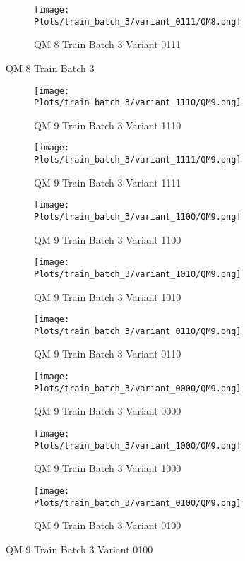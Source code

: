 \documentclass{DissertateFigs}
\begin{document}
\begin{figure}[t!]
\medskip

    \begin{subfigure}{0.38\textwidth}
    \texttt{[image: Plots/train\_batch\_3/variant\_0111/QM8.png]}
    \caption{QM 8 Train Batch 3 Variant 0111}
    \end{subfigure}
\caption{QM 8 Train Batch 3}
    \end{figure}
\clearpage
\begin{figure}[t!]
    \begin{subfigure}{0.47\textwidth}
    \texttt{[image: Plots/train\_batch\_3/variant\_1110/QM9.png]}
    \caption{QM 9 Train Batch 3 Variant 1110}
    \end{subfigure}
    \begin{subfigure}{0.47\textwidth}
    \texttt{[image: Plots/train\_batch\_3/variant\_1111/QM9.png]}
    \caption{QM 9 Train Batch 3 Variant 1111}
    \end{subfigure}

\medskip

    \begin{subfigure}{0.47\textwidth}
    \texttt{[image: Plots/train\_batch\_3/variant\_1100/QM9.png]}
    \caption{QM 9 Train Batch 3 Variant 1100}
    \end{subfigure}
    \begin{subfigure}{0.47\textwidth}
    \texttt{[image: Plots/train\_batch\_3/variant\_1010/QM9.png]}
    \caption{QM 9 Train Batch 3 Variant 1010}
    \end{subfigure}

\medskip

    \begin{subfigure}{0.47\textwidth}
    \texttt{[image: Plots/train\_batch\_3/variant\_0110/QM9.png]}
    \caption{QM 9 Train Batch 3 Variant 0110}
    \end{subfigure}
    \begin{subfigure}{0.47\textwidth}
    \texttt{[image: Plots/train\_batch\_3/variant\_0000/QM9.png]}
    \caption{QM 9 Train Batch 3 Variant 0000}
    \end{subfigure}

\medskip

    \begin{subfigure}{0.47\textwidth}
    \texttt{[image: Plots/train\_batch\_3/variant\_1000/QM9.png]}
    \caption{QM 9 Train Batch 3 Variant 1000}
    \end{subfigure}
    \begin{subfigure}{0.47\textwidth}
    \texttt{[image: Plots/train\_batch\_3/variant\_0100/QM9.png]}
    \caption{QM 9 Train Batch 3 Variant 0100}
    \end{subfigure}


\end{figure}
\end{document}
